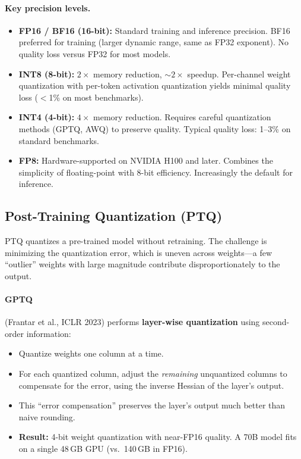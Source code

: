\paragraph{Key precision levels.}
\begin{itemize}
    \item \textbf{FP16 / BF16 (16-bit):}  Standard training and inference precision.
          BF16 preferred for training (larger dynamic range, same as FP32 exponent).
          No quality loss versus FP32 for most models.
    \item \textbf{INT8 (8-bit):}  $2\times$ memory reduction, $\sim$$2\times$ speedup.
          Per-channel weight quantization with per-token activation quantization yields
          minimal quality loss ($<$1\% on most benchmarks).
    \item \textbf{INT4 (4-bit):}  $4\times$ memory reduction.  Requires careful
          quantization methods (GPTQ, AWQ) to preserve quality.  Typical quality loss:
          1--3\% on standard benchmarks.
    \item \textbf{FP8:}  Hardware-supported on NVIDIA H100 and later.  Combines the
          simplicity of floating-point with 8-bit efficiency.  Increasingly the default
          for inference.
\end{itemize}

\subsection{Post-Training Quantization (PTQ)}

PTQ quantizes a pre-trained model without retraining.  The challenge is minimizing the
quantization error, which is uneven across weights---a few ``outlier'' weights with large
magnitude contribute disproportionately to the output.

\paragraph{GPTQ} (Frantar et al., ICLR 2023) performs \textbf{layer-wise quantization}
using second-order information:
\begin{itemize}
    \item Quantize weights one column at a time.
    \item For each quantized column, adjust the \emph{remaining} unquantized columns to
          compensate for the error, using the inverse Hessian of the layer's output.
    \item This ``error compensation'' preserves the layer's output much better than
          naive rounding.
    \item \textbf{Result:} 4-bit weight quantization with near-FP16 quality.
          A 70B model fits on a single 48\,GB GPU (vs.\ 140\,GB in FP16).
\end{itemize}

